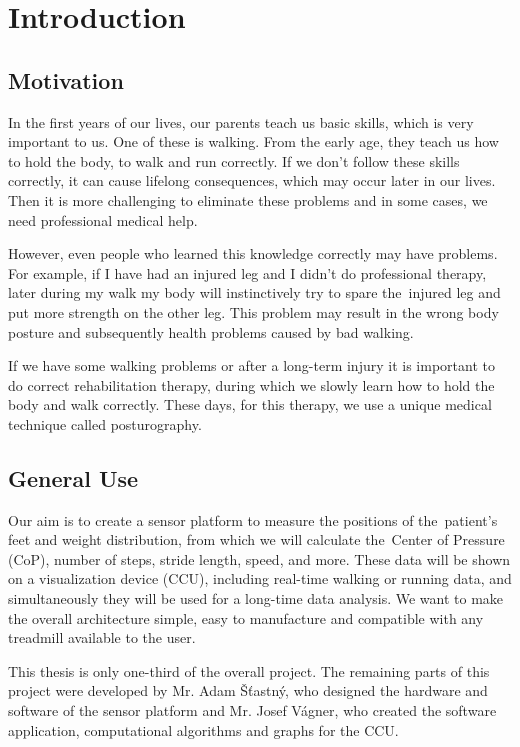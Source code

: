 \chapter{Introduction}

    \section{Motivation}
    In the first years of our lives, our parents teach us basic skills, which is very important to us.
    One of these is walking. From the early age, they teach us how to hold the body, to walk and run correctly.
    If we don't follow these skills correctly, it can cause lifelong consequences, which may occur later in our
    lives. Then it is more challenging to eliminate these problems and in some cases, we need professional medical
    help.
            
    However, even people who learned this knowledge correctly may have problems. For example, if I have had an
    injured leg and I didn't do professional therapy, later during my walk my body will instinctively try to
    spare the~injured leg and put more strength on the other leg. This problem may result in the wrong body posture
    and subsequently health problems caused by bad walking.
            
    If we have some walking problems or after a long-term injury it is important to do correct rehabilitation
    therapy, during which we slowly learn how to hold the body and walk correctly. These days, for this therapy,
    we use a unique medical technique called posturography.

    \section{General Use}
        Our aim is to create a sensor platform to measure the positions of the~patient’s feet and weight distribution, from which we will calculate
        the~Center of Pressure (CoP), number of steps, stride length, speed, and more. These data will be shown on a visualization device (CCU),
        including real-time walking or running data, and simultaneously they will be used for a long-time data analysis.
        \newpage
        We want to make the overall architecture simple, easy to manufacture and compatible with any treadmill available to the user.

        This thesis is only one-third of the overall project. The remaining parts of this project were
        developed by Mr. Adam Šťastný, who designed the hardware and software of the sensor platform and
        Mr. Josef Vágner, who created the software application, computational algorithms and graphs for the CCU.


